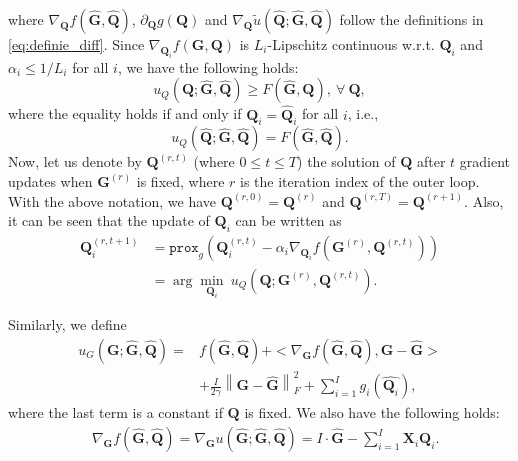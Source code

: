\documentclass[10pt,journal]{IEEEtran}
\newcommand{\G}{\boldsymbol{G}}
\newcommand{\Q}{\boldsymbol{Q}}
\newcommand{\X}{\boldsymbol{X}}
\begin{document}
where $\nabla_{{\bm Q}} f\left(\hat{\bm G},\hat{\bm Q}\right)$, $\partial_{\Q} g(\Q)$ and $\nabla_{{\bm Q}}\tilde{u}\left(\hat{\bm Q};\hat{\bm G},\hat{\bm Q}\right)$ follow the definitions in \eqref{eq:definie_diff}.
Since $\nabla_{{\bm Q}_i} f({\bm G},{\bm Q})$ is $L_i$-Lipschitz continuous w.r.t. ${\bm Q}_i$ and $\alpha_i\leq 1/L_i$ for all $i$, we have the following holds:
\begin{equation}\label{eq:gleqf}
	u_Q\left({\bm Q};\hat{\bm G},\hat{\bm Q}\right)\geq F\left(\hat{\bm G},{\bm Q}\right),~\forall~{\bm Q},
\end{equation}
where the equality holds if and only if ${\bm Q}_i = \hat{\bm Q}_i$ for all $i$, i.e.,
\begin{equation}\label{eq:geqf}
u_Q\left(\hat{\bm Q};\hat{\bm G},\hat{\bm Q}\right) = F\left(\hat{\bm G},\hat{\bm Q}\right).
\end{equation}
Now, let us denote by ${\bm Q}^{(r,t)}$ (where $0\leq t\leq T$) the solution of ${\bm Q}$
after $t$ gradient updates when ${\bm G}^{(r)}$ is fixed, where $r$ is the iteration index of the outer loop.
With the above notation, we have ${\bm Q}^{(r,0)}={\bm Q}^{(r)}$ and ${\bm Q}^{(r,T)}={\bm Q}^{(r+1)}$.
Also, it can be seen that the update of ${\bm Q}_i$ can be written as
\begin{equation}\label{eq:updateQ}
\begin{aligned}
	{\bm Q}_i^{(r,t+1)}&= \texttt{prox}_{g}\left({\bm Q}_i^{(r,t)} - \alpha_i \nabla_{{\bm Q}_i} f\left({\bm G}^{(r)},{\bm Q}^{(r,t)}\right)\right)\\
	                 &= \arg\min_{{\bm Q}_i}~u_{Q}\left( {\bm Q};{\bm G}^{(r)},{\bm Q}^{(r,t)} \right).
\end{aligned}
\end{equation}


Similarly, we define
\begin{align*}
u_G\left(\G;\hat{\bm G},\hat{\bm Q}\right) = &f(\hat{\bm G},\hat{\bm Q}) +  <\nabla_{\G} f(\hat{\bm G},\hat{\bm Q}),\G-\hat{\bm G}>\\
& + \frac{I}{2\gamma}\left\|\G-\hat{\G}\right\|_F^2+ \sum_{i=1}^Ig_i(\hat{\Q_i}),
\end{align*}
where the last term is a constant if $\Q$ is fixed.
We also have the following holds:
\begin{equation}\label{eq:Ggradequal}
\begin{aligned}
	&\nabla_{\G} f\left(\hat{\bm G},\hat{\bm Q}\right)=\nabla_{\G} {u}\left(\hat{\bm G};\hat{\bm G},\hat{\bm Q}\right)=I\cdot\hat{\bm G} - \sum_{i=1}^I{\X_i\Q_i}.
\end{aligned}
\end{equation}
\end{document}
